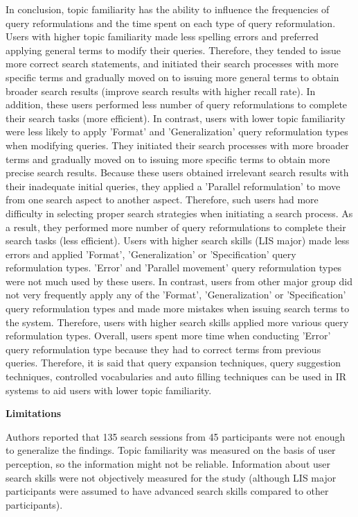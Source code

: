 \documentclass[]{article}
\begin{document}
In conclusion, topic familiarity has the ability to influence the frequencies of query reformulations and the time spent on each type of query reformulation. Users with higher topic familiarity made less spelling errors and preferred applying general terms to modify their queries. Therefore, they tended to issue more correct search statements, and initiated their search processes with more specific terms and gradually moved on to issuing more general terms to obtain broader search results (improve search results with higher recall rate). In addition, these users performed less number of query reformulations to complete their search tasks (more efficient). In contrast, users with lower topic familiarity were less likely to apply 'Format' and 'Generalization' query reformulation types when modifying queries. They initiated their search processes with more broader terms and gradually moved on to issuing more specific terms to obtain more precise search results. Because these users obtained irrelevant search results with their inadequate initial queries, they applied a 'Parallel reformulation' to move from one search aspect to another aspect. Therefore, such users had more difficulty in selecting proper search strategies when initiating a search process. As a result, they performed more number of query reformulations to complete their search tasks (less efficient). Users with higher search skills (LIS major) made less errors and applied 'Format', 'Generalization' or 'Specification' query reformulation types. 'Error' and 'Parallel movement' query reformulation types were not much used by these users. In contrast, users from other major group did not very frequently apply any of the 'Format', 'Generalization' or 'Specification' query reformulation types and made more mistakes when issuing search terms to the system. Therefore, users with higher search skills applied more various query reformulation types. Overall, users spent more time when conducting 'Error' query reformulation type because they had to correct terms from previous queries. Therefore, it is said that query expansion techniques, query suggestion techniques, controlled vocabularies and auto filling techniques can be used in IR systems to aid users with lower topic familiarity.                   
 
\textbf{Limitations}

Authors reported that 135 search sessions from 45 participants were not enough to generalize the findings. Topic familiarity was measured on the basis of user perception, so the information might not be reliable. Information about user search skills were not objectively measured for the study (although LIS major participants were assumed to have advanced search skills compared to other participants).    
 
\end{document}
